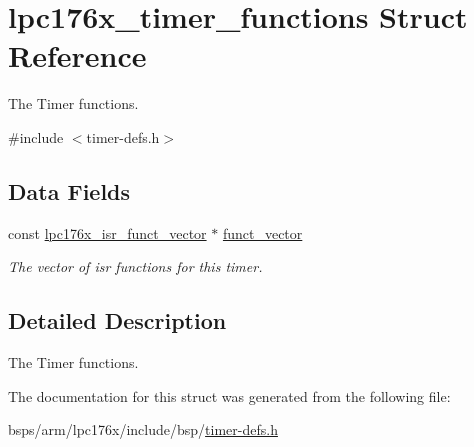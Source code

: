 \hypertarget{structlpc176x__timer__functions}{}\section{lpc176x\+\_\+timer\+\_\+functions Struct Reference}
\label{structlpc176x__timer__functions}


The Timer functions.  




{\ttfamily \#include $<$timer-\/defs.\+h$>$}

\subsection*{Data Fields}
\begin{DoxyCompactItemize}
\item 
\mbox{\label{structlpc176x__timer__functions_a5c70111837ba42bb8cb41c43761bab27}} 
const \mbox{\hyperlink{timer-defs_8h_a3f95ff573f1143546a0076bc064f8e39}{lpc176x\+\_\+isr\+\_\+funct\+\_\+vector}} $\ast$ \mbox{\hyperlink{structlpc176x__timer__functions_a5c70111837ba42bb8cb41c43761bab27}{funct\+\_\+vector}}
\begin{DoxyCompactList}\small\item\em The vector of isr functions for this timer. \end{DoxyCompactList}\end{DoxyCompactItemize}


\subsection{Detailed Description}
The Timer functions. 

The documentation for this struct was generated from the following file\+:\begin{DoxyCompactItemize}
\item 
bsps/arm/lpc176x/include/bsp/\mbox{\hyperlink{timer-defs_8h}{timer-\/defs.\+h}}\end{DoxyCompactItemize}
